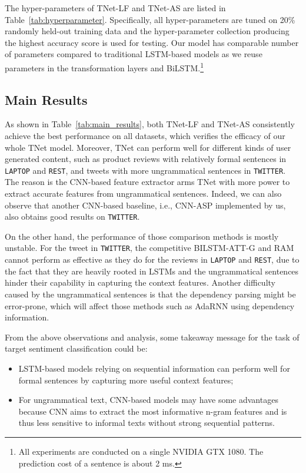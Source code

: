 \documentclass[11pt,a4paper]{article}
\begin{document}
The hyper-parameters of TNet-LF and TNet-AS are listed in Table~\ref{tab:hyperparameter}. Specifically, all hyper-parameters are tuned on 20\% randomly held-out training data 
and the hyper-parameter collection producing the highest accuracy score is used for testing. 
Our model has comparable number of parameters compared to traditional LSTM-based models as we reuse parameters in the transformation layers and BiLSTM.\footnote{All experiments are conducted on a single NVIDIA GTX 1080. The prediction cost of a sentence is about 2 ms.}


\subsection{Main Results}
As shown in Table~\ref{tab:main_results}, both TNet-LF and TNet-AS consistently achieve the best performance on all datasets, which verifies the efficacy of our whole TNet model. Moreover, TNet can perform well for different kinds of user generated content, such as product reviews with relatively formal sentences in \texttt{LAPTOP} and \texttt{REST}, and tweets with more ungrammatical sentences in \texttt{TWITTER}. The reason is the CNN-based feature extractor arms TNet with more power to extract accurate features from ungrammatical sentences. Indeed, we can also observe that another CNN-based baseline, i.e., CNN-ASP implemented by us, also obtains good results on \texttt{TWITTER}. 




On the other hand, the performance of those comparison methods is mostly unstable. For the tweet in \texttt{TWITTER}, the competitive BILSTM-ATT-G and RAM cannot perform as effective as they do for the reviews in \texttt{LAPTOP} and \texttt{REST}, due to the fact that they are heavily rooted in LSTMs and the ungrammatical sentences hinder their capability in capturing the context features. Another difficulty caused by the ungrammatical sentences is that the dependency parsing might be error-prone, which will affect those methods such as AdaRNN using dependency information.

From the above observations and analysis, some takeaway message for the task of target sentiment classification could be: 
\begin{itemize}
\item LSTM-based models relying on sequential information can perform well for formal sentences by capturing more useful context features; 
\item For ungrammatical text, CNN-based models may have some advantages because CNN aims to extract the most informative n-gram features and is thus less sensitive to informal texts without strong sequential patterns.
\end{itemize}
\end{document}
